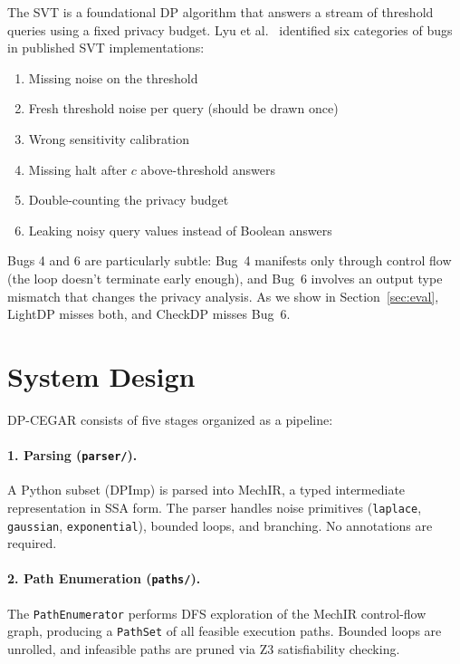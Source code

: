 \documentclass[sigplan,screen,nonacm]{acmart}
\begin{document}
The SVT is a foundational DP algorithm that answers a stream of threshold
queries using a fixed privacy budget. Lyu et al.~\cite{lyu2017understanding}
identified six categories of bugs in published SVT implementations:

\begin{enumerate}
\item Missing noise on the threshold
\item Fresh threshold noise per query (should be drawn once)
\item Wrong sensitivity calibration
\item Missing halt after $c$ above-threshold answers
\item Double-counting the privacy budget
\item Leaking noisy query values instead of Boolean answers
\end{enumerate}

\noindent Bugs 4 and 6 are particularly subtle: Bug~4 manifests only through
control flow (the loop doesn't terminate early enough), and Bug~6 involves an
output type mismatch that changes the privacy analysis. As we show in
Section~\ref{sec:eval}, LightDP misses both, and CheckDP misses Bug~6.

\section{System Design}
\label{sec:design}

\textsc{DP-CEGAR} consists of five stages organized as a pipeline:

\paragraph{1. Parsing (\texttt{parser/}).}
A Python subset (DPImp) is parsed into MechIR, a typed intermediate
representation in SSA form. The parser handles noise primitives
(\texttt{laplace}, \texttt{gaussian}, \texttt{exponential}), bounded loops,
and branching. No annotations are required.

\paragraph{2. Path Enumeration (\texttt{paths/}).}
The \texttt{PathEnumerator} performs DFS exploration of the MechIR control-flow
graph, producing a \texttt{PathSet} of all feasible execution paths. Bounded
loops are unrolled, and infeasible paths are pruned via Z3 satisfiability
checking.
\end{document}
